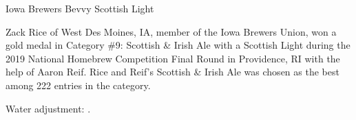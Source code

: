 \stylesection{\stylescottishlight}

\begin{recipe}{Iowa Brewers Bevvy Scottish Light}

\begin{aboutblock}
Zack Rice of West Des Moines, IA, member of the Iowa Brewers Union, won a gold
medal in Category \#9: Scottish \& Irish Ale with a Scottish Light during the
2019 National Homebrew Competition Final Round in Providence, RI with the help
of Aaron Reif. Rice and Reif's Scottish \& Irish Ale was chosen as the best among
222 entries in the category. \sourceaha
\end{aboutblock}


\begin{methodandtiming}
 
\begin{mashsteps}
\end{mashsteps}

\begin{fermentationsteps}
\end{fermentationsteps}

\begin{directions}
Water adjustment: .
\end{directions}

\end{methodandtiming}

\recipebreak

\begin{ingredientsblock}

\begin{malts}
\end{malts}

\begin{hops}
\end{hops}


\end{ingredientsblock}

\end{recipe}
